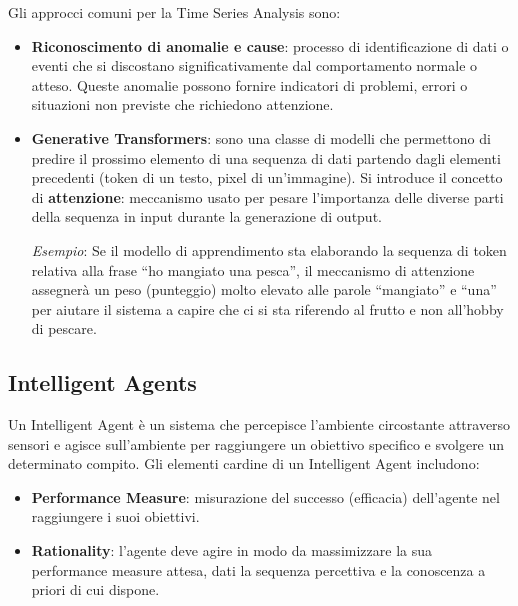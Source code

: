 \documentclass[a4paper, 11pt, oneside]{book}
\theoremstyle{definition}
\begin{document}
	Gli approcci comuni per la Time Series Analysis sono:
	\begin{itemize}
		\item \textbf{Riconoscimento di anomalie e cause}: processo di identificazione
			di dati o eventi che si discostano significativamente dal comportamento normale
			o atteso. Queste anomalie possono fornire indicatori di problemi, errori o
			situazioni non previste che richiedono attenzione.

		\item \textbf{Generative Transformers}: sono una classe di modelli che permettono
			di predire il prossimo elemento di una sequenza di dati partendo dagli elementi
			precedenti (token di un testo, pixel di un'immagine). Si introduce il concetto
			di \textbf{attenzione}: meccanismo usato per pesare l'importanza delle diverse
			parti della sequenza in input durante la generazione di output.

			\emph{Esempio}: Se il modello di apprendimento sta elaborando la sequenza di
			token relativa alla frase ``ho mangiato una pesca'', il meccanismo di
			attenzione assegner\`a un peso (punteggio) molto elevato alle
			parole ``mangiato'' e ``una'' per aiutare il sistema a capire che ci si
			sta riferendo al frutto e non all'hobby di pescare.
	\end{itemize}

	\subsection{Intelligent Agents}
	Un Intelligent Agent \`e un sistema che percepisce l'ambiente circostante
	attraverso sensori e agisce sull'ambiente per raggiungere un obiettivo
	specifico e svolgere un determinato compito. Gli elementi cardine di un
	Intelligent Agent includono:
	\begin{itemize}
		\item \textbf{Performance Measure}: misurazione del successo (efficacia) dell'agente
			nel raggiungere i suoi obiettivi.

		\item \textbf{Rationality}: l'agente deve agire in modo da massimizzare la sua
			performance measure attesa, dati la sequenza percettiva e la conoscenza a
			priori di cui dispone.
	\end{itemize}
\end{document}
